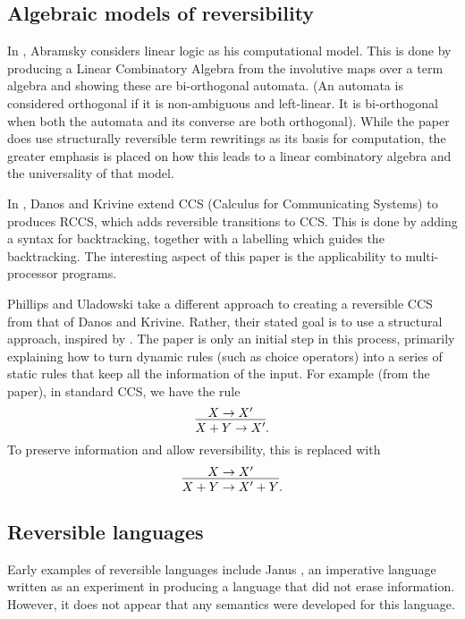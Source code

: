 \subsection{Algebraic models of reversibility}
\label{subsec:algebraic_models_of_reversibility}
In \cite{abramsky05:reversible}, Abramsky considers linear logic as his computational model. This is
done by producing a Linear Combinatory Algebra \cite{abramsky02:GOI} from the involutive maps over a
term algebra and showing these are bi-orthogonal automata. (An automata is considered orthogonal if
it is non-ambiguous and left-linear. It is bi-orthogonal when both the automata and its converse are
both orthogonal). While the paper does use structurally reversible term rewritings as its
basis for computation, the greater emphasis is placed on how this leads to a linear combinatory
algebra and the universality of that model.

In \cite{danos2004reversible}, Danos and Krivine extend CCS (Calculus for Communicating Systems)
\cite{milner1980calculus,milner1989communication} to produces RCCS, which adds reversible
transitions to CCS. This is done by adding a syntax for backtracking, together with a labelling
which guides the backtracking. The interesting aspect of this paper is the applicability to
multi-processor programs.

Phillips and Uladowski \cite{phillips2006operational} take a different approach to creating a
reversible CCS from that of Danos and Krivine. Rather, their stated goal is to use a structural
approach, inspired by \cite{abramsky05:reversible}. The paper is only an initial step in this
process, primarily explaining how to turn dynamic rules (such as choice operators) into a series of
static rules that keep all the information of the input. For example (from the paper), in standard
CCS, we have the rule
\[
  \infer{X+Y \to X'}{X\to X'}.
\]
To preserve information and allow reversibility, this is replaced with
\[
  \infer{X+Y \to X' +Y}{X\to X'}.
\]


\subsection{Reversible languages}
\label{subsec:reversible_languages}

Early examples of reversible languages include Janus \cite{lutz1986janus}, an imperative language
written as an experiment in producing a language that did not erase information. However, it does
not appear that any semantics were developed for this language.

